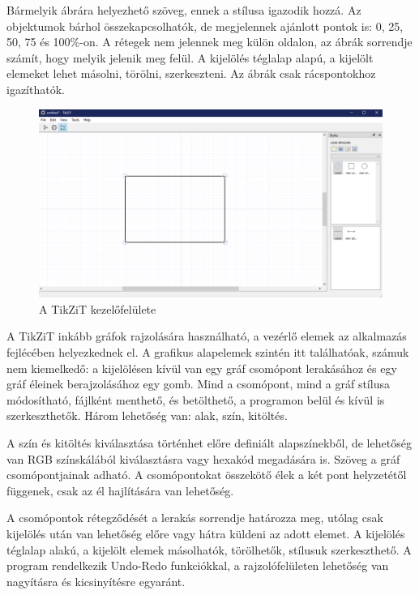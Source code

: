 Bármelyik ábrára helyezhető szöveg, ennek a stílusa igazodik hozzá. Az objektumok bárhol összekapcsolhatók, de megjelennek ajánlott pontok is: 0, 25, 50, 75 és 100\%-on. A rétegek nem jelennek meg külön oldalon, az ábrák sorrendje számít, hogy melyik jelenik meg felül. A kijelölés téglalap alapú, a kijelölt elemeket lehet másolni, törölni, szerkeszteni. Az ábrák csak rácspontokhoz igazíthatók.



\begin{figure}[!h]
	\includegraphics[width=\textwidth]{images/tikzit.png}
	\caption{A TikZiT kezelőfelülete \cite{tikzit}}
	\label{fig:tikzit}
\end{figure}

A TikZiT inkább gráfok rajzolására használható, a vezérlő elemek az alkalmazás fejlécében helyezkednek el. A grafikus alapelemek szintén itt találhatóak, számuk nem kiemelkedő: a kijelölésen kívül van egy gráf csomópont lerakásához és egy gráf éleinek berajzolásához egy gomb. Mind a csomópont, mind a gráf stílusa módosítható, fájlként menthető, és betölthető, a programon belül és kívül is szerkeszthetők. Három lehetőség van: alak, szín, kitöltés. 

A szín és kitöltés kiválasztása történhet előre definiált alapszínekből, de lehetőség van RGB színskálából kiválasztásra vagy hexakód megadására is. Szöveg a gráf csomópontjainak adható. A csomópontokat összekötő élek a két pont helyzetétől függenek, csak az él hajlítására van lehetőség. 

A csomópontok rétegződését a lerakás sorrendje határozza meg, utólag csak kijelölés után van lehetőség előre vagy hátra küldeni az adott elemet. A kijelölés téglalap alakú, a kijelölt elemek másolhatók, törölhetők, stílusuk szerkeszthető.  A program rendelkezik Undo-Redo funkciókkal, a rajzolófelületen lehetőség van nagyításra és kicsinyítésre egyaránt. 


